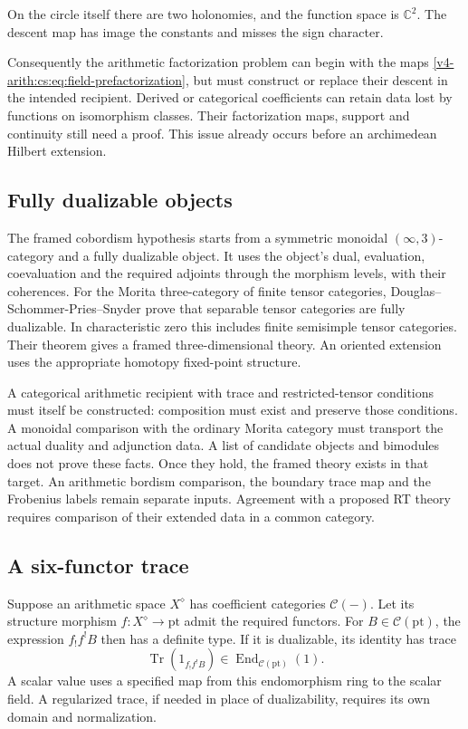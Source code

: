On the circle itself there are two holonomies, and the function space is
\(\mathbb C^2\). The descent map has image the constants and misses the sign
character.

Consequently the arithmetic factorization problem can begin with the maps
\eqref{v4-arith:cs:eq:field-prefactorization}, but must construct or replace
their descent in the intended recipient. Derived or categorical coefficients
can retain data lost by functions on isomorphism classes. Their
factorization maps, support and continuity still need a proof. This issue
already occurs before an archimedean Hilbert extension.

\subsection{Fully dualizable objects}

The framed cobordism hypothesis starts from a symmetric monoidal
\((\infty,3)\)-category and a fully dualizable object. It uses the object's
dual, evaluation, coevaluation and the required adjoints through the
morphism levels, with their coherences. For the Morita three-category of
finite tensor categories, Douglas--Schommer-Pries--Snyder prove that
separable tensor categories are fully dualizable. In characteristic zero
this includes finite semisimple tensor categories. Their theorem gives a
framed three-dimensional theory. An oriented extension uses the appropriate
homotopy fixed-point structure.

A categorical arithmetic recipient with trace and restricted-tensor
conditions must itself be constructed: composition must exist and preserve
those conditions. A monoidal comparison with the ordinary Morita category
must transport the actual duality and adjunction data. A list of candidate
objects and bimodules does not prove these facts. Once they hold, the framed
theory exists in that target. An arithmetic bordism comparison, the boundary
trace map and the Frobenius labels remain separate inputs. Agreement with a
proposed RT theory requires comparison of their extended data in a common
category.

\subsection{A six-functor trace}

Suppose an arithmetic space \(X^\diamond\) has coefficient categories
\(\mathcal C(-)\). Let its structure morphism \(f:X^\diamond\to\mathrm{pt}\)
admit the required functors. For \(B\in\mathcal C(\mathrm{pt})\), the
expression \(f_!f^!B\) then has a definite type. If it is dualizable, its
identity has trace
\[
 \operatorname{Tr}(1_{f_!f^!B})
          \in\operatorname{End}_{\mathcal C(\mathrm{pt})}(1).
\]
A scalar value uses a specified map from this endomorphism ring to the
scalar field. A regularized trace, if needed in place of dualizability,
requires its own domain and normalization.

